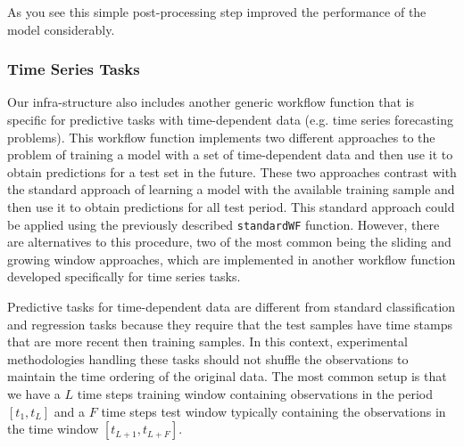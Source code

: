 \documentclass[10pt,a4paper]{article}\usepackage[]{graphicx}\usepackage[]{color}
\begin{document}
As you see this simple post-processing step improved the performance of the model considerably.


\subsubsection{Time Series Tasks}\label{sec:timeseriesWF}

Our infra-structure also includes another generic workflow function
that is specific for predictive tasks with time-dependent data
(e.g. time series forecasting problems). This workflow function
implements two different approaches to the problem of training a
 model with a set of time-dependent data and then use it to
obtain predictions for a test set in the future. These two approaches
contrast with the standard approach of learning a model with the
available training sample and then use it to obtain predictions for
all test period. This standard approach could be applied using the previously
described \texttt{standardWF} function. However, there are
alternatives to this procedure, two of the most common being the
sliding and growing window approaches, which are implemented in another workflow function developed specifically for time series tasks.

Predictive tasks for time-dependent data are different from standard
classification and regression tasks because they require that the test
samples have time stamps that are more recent then training
samples. In this context, experimental methodologies handling these
tasks should not shuffle the observations to maintain the time ordering
of the original data. The most common setup is that we have a $L$  time steps
training window containing observations in the period $[t_1,t_L]$ and a $F$
time steps test window typically containing the observations in the
time window $[t_{L+1},t_{L+F}]$. 
\end{document}
